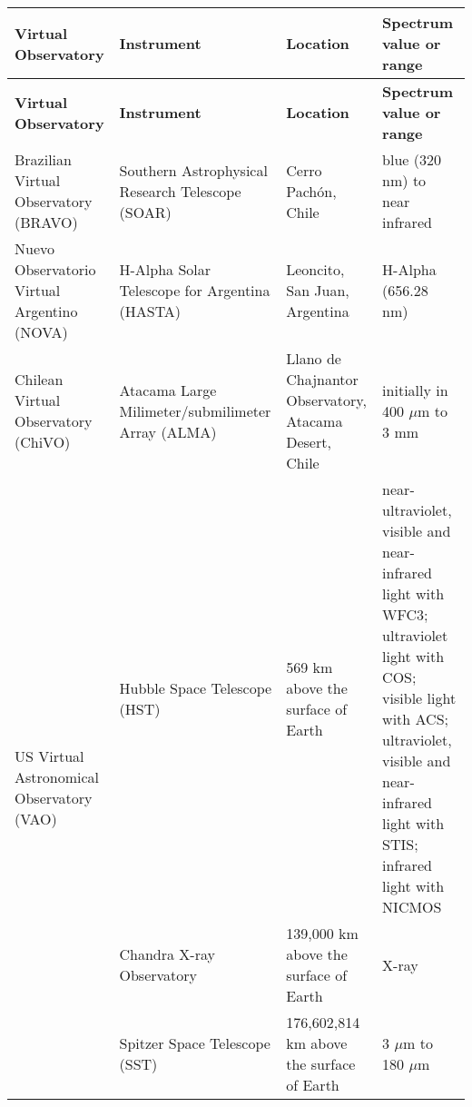 \begin{center}  
\begin{longtable}{|m{3cm}|m{3.5cm}|m{3.5cm}|m{4cm}|}
    \hline                                                                      
    \textbf{Virtual Observatory} & \textbf{Instrument} & \textbf{Location} &
    \textbf{Spectrum value or range} \\
    \hline                                                                      
    \endfirsthead
    \hline                                                                      
    \textbf{Virtual Observatory} & \textbf{Instrument} & \textbf{Location} &
    \textbf{Spectrum value or range} \\
    \hline                                                                      
    \endhead
    Brazilian Virtual Observatory (BRAVO) & Southern Astrophysical Research
    Telescope (SOAR) & Cerro Pach\'{o}n, Chile & blue (320 nm) to near infrared
    \cite{website:SOAR_EMS} \\
    \hline                                                                      
    Nuevo Observatorio Virtual Argentino (NOVA) & H-Alpha Solar Telescope for
    Argentina (HASTA) & Leoncito, San Juan, Argentina & H-Alpha (656.28 nm)
    \cite{website:HASTA_EMS} \\
    \hline
    Chilean Virtual Observatory (ChiVO) & Atacama Large Milimeter/submilimeter
    Array (ALMA) & Llano de Chajnantor Observatory, Atacama Desert, Chile &
    initially in 400 $ \mu $m to 3 mm \cite{website:ALMA_EMS} \\
    \hline
    \multirow{3}{3cm}{US Virtual Astronomical Observatory (VAO)} & Hubble Space
    Telescope (HST) & 569 km above the surface of Earth & near-ultraviolet,
    visible and near-infrared light with WFC3; ultraviolet light with COS;
    visible light with ACS; ultraviolet, visible and near-infrared light with
    STIS; infrared light with NICMOS \cite{website:HST_EMS} \\
     \cline{2-4}
     & Chandra X-ray Observatory & 139,000 km above the surface of Earth & X-ray
     \cite{website:Chandra_EMS} \\
     \cline{2-4}
     & Spitzer Space Telescope (SST) & 176,602,814 km above the surface of Earth
     \cite{website:SST_EMS_1} & 3 $ \mu $m to 180 $ \mu $m
     \cite{website:SST_EMS_2} \\

\end{longtable}
\end{center}
